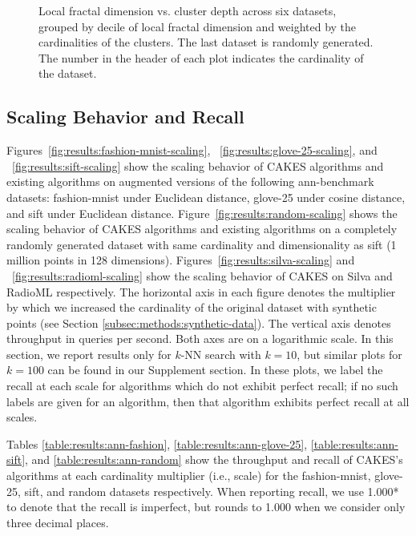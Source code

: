 \begin{figure}
\begin{subfigure}[b]{0.47\textwidth}
    \label{fig:results:random-lfd}
    \end{subfigure}
    

    \caption{Local fractal dimension vs. cluster depth across six datasets, grouped by decile of local fractal dimension and weighted by the cardinalities of the clusters. The last dataset is randomly generated. The number in the header of each plot indicates the cardinality of the dataset.}
    \label{fig:results:lfd-plots}
\end{figure}



\subsection{Scaling Behavior and Recall}
\label{subsec:scaling-behavior-results}

Figures~\ref{fig:results:fashion-mnist-scaling}, ~\ref{fig:results:glove-25-scaling}, and ~\ref{fig:results:sift-scaling} show the scaling behavior of CAKES algorithms and existing algorithms on augmented versions of the following ann-benchmark datasets: fashion-mnist under Euclidean distance, glove-25 under cosine distance, and sift under Euclidean distance. 
Figure~\ref{fig:results:random-scaling} shows the scaling behavior of CAKES algorithms and existing algorithms on a completely randomly generated dataset with same cardinality and dimensionality as sift (1 million points in 128 dimensions).
Figures~\ref{fig:results:silva-scaling} and ~\ref{fig:results:radioml-scaling} show the scaling behavior of CAKES on Silva and RadioML respectively.
The horizontal axis in each figure denotes the multiplier by which we increased the cardinality of the original dataset with synthetic points (see Section \ref{subsec:methods:synthetic-data}). 
The vertical axis denotes throughput in queries per second. 
Both axes are on a logarithmic scale. 
In this section, we report results only for $k$-NN search with $k = 10$, but similar plots for $k=100$ can be found in our Supplement section. 
In these plots, we label the recall at each scale for algorithms which do not exhibit perfect recall; if no such labels are given for an algorithm, then that algorithm exhibits perfect recall at all scales.


Tables \ref{table:results:ann-fashion}, \ref{table:results:ann-glove-25}, \ref{table:results:ann-sift}, and \ref{table:results:ann-random} show the throughput and recall of CAKES's algorithms at each cardinality multiplier (i.e., scale) for the fashion-mnist, glove-25, sift, and random datasets respectively. When reporting recall, we use 1.000* to denote that the recall is imperfect, but rounds to 1.000 when we consider
only three decimal places.

